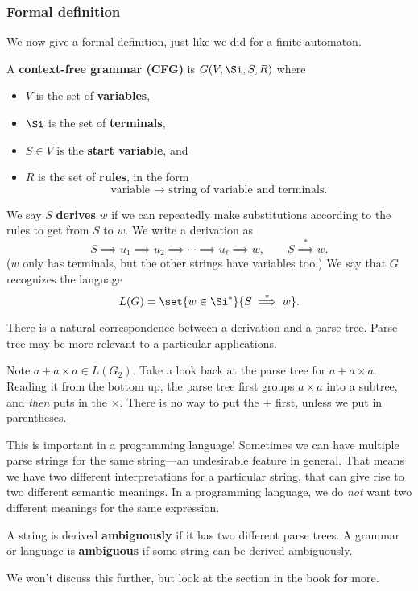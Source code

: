 \subsubsection{Formal definition}

We now give a formal definition, just like we did for a finite automaton.
\begin{df}
A \textbf{context-free grammar (CFG)}  is $G(V,\Si, S,R)$ where
\begin{itemize}
\item
$V$ is the set of \textbf{variables},
\item $\Si$ is the set of \textbf{terminals},
\item $S\in V$ is the \textbf{start variable},
and 
\item $R$ is the set of \textbf{rules}, in the form
\[
\text{variable }\to \text{ string of variable and terminals.}
\]
\end{itemize}
We say $S$ \textbf{derives} $w$ if we can repeatedly make substitutions according to the rules to get from $S$ to $w$. We write a derivation as 
\[
S\implies u_1\implies u_2\implies \cdots \implies u_{\ell}\implies w,\qquad S\stackrel{*}{\implies} w.
\]
($w$ only has terminals, but the other strings have variables too.)
We say that $G$ recognizes the language
\[
L(G)=\set{w\in \Si^*}{S\stackrel{*}{\implies}w}.
\] 
\end{df}

There is a natural correspondence between a derivation and a parse tree. Parse tree may be more relevant to a particular applications.

Note $a+a\times a\in L(G_2)$. Take a look back at the parse tree for $a+a\times a$. Reading it from the bottom up, the parse tree first groups $a\times a$ into a subtree, and {\it then} puts in the $\times$. %
There is no way to put the $+$ first, unless we put in parentheses.

This is important in a programming language! %
Sometimes we can have multiple parse strings for the same string---an undesirable feature in general. That means we have two different interpretations for a particular string, that can give rise to two different semantic meanings. In a programming language, we do {\it not} want two different meanings for the same expression.
\begin{df}
A string is derived \textbf{ambiguously} if it has two different parse trees. A  grammar or language is \textbf{ambiguous} if some string can be derived ambiguously.
\end{df}
We won't discuss this further, but look at the section in the book for more.


